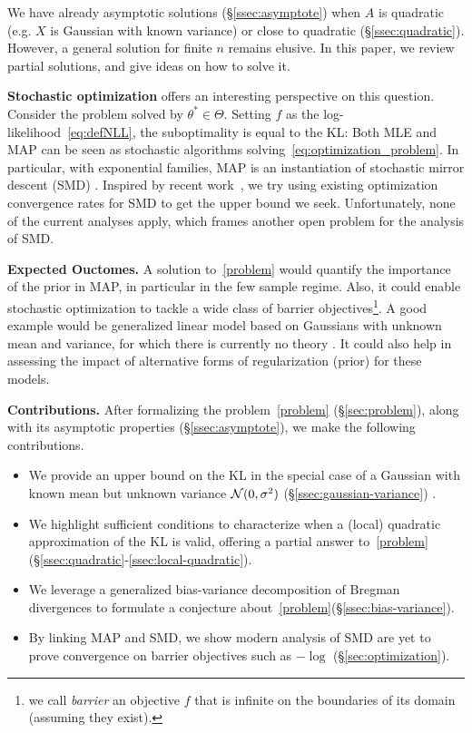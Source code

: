 \documentclass[twoside]{article}
\newcommand{\logpart}{A}
\newcommand{\nat}{\theta}
\begin{document}
We have already asymptotic solutions (\S\ref{ssec:asymptote}) when $\logpart$ is quadratic (e.g. $X$ is Gaussian with known variance)
or close to quadratic (\S\ref{ssec:quadratic}).
However, a  general solution for finite $n$ remains elusive.
In this paper, we review partial solutions, and give ideas on how to solve it.

{\bf Stochastic optimization} offers an interesting perspective on this question.
Consider the problem
solved by $\nat^*\in \Theta$.
Setting $f$ as the log-likelihood~\eqref{eq:defNLL}, the suboptimality is equal to the KL:
\alignn{
	f(\nat) - f(\nat^*) = \KL\paren{p_{\nat^*} || p_{\nat} }
	\label{eq:suboptimalityKL}
}
Both MLE and MAP can be seen as stochastic algorithms solving~\eqref{eq:optimization_problem}.
In particular, with exponential families, MAP is an instantiation of stochastic mirror descent (SMD) \citep{nemirovski2009robust}.
Inspired by recent work~\citep{lepriol2021analysis, kunstner2020homeomorphic}, we try using existing optimization convergence rates for SMD to get the upper bound we seek.
Unfortunately, none of the current analyses apply, which frames another open problem for the analysis of SMD.

{\bf Expected Ouctomes.}
A solution to~\eqref{problem} would quantify the importance of the prior in MAP, in particular in the few sample regime.%
Also, it could enable stochastic optimization to tackle a wide class of barrier objectives\footnote{we call \emph{barrier} an objective $f$ that is infinite on the boundaries of its domain (assuming they exist).}.
A good example would be generalized linear model based on Gaussians with unknown mean and variance, for which there is currently no theory \citep{bach2013nonstronglyconvex}.
It could also help in assessing the impact of alternative forms of regularization (prior) for these models. 

{\bf Contributions.}
After formalizing the problem~\eqref{problem} (\S\ref{sec:problem}), along with its asymptotic properties (\S\ref{ssec:asymptote}), we make the following contributions.
\begin{itemize}
	\itemsep0em
	\item We provide an upper bound on the KL in the special case of a Gaussian with known mean but unknown variance ${\mathcal N}(0,\sigma^2)$ (\S\ref{ssec:gaussian-variance}) .
	\item We highlight sufficient conditions to characterize when a (local) quadratic approximation of the KL is valid, offering a partial answer to~\eqref{problem} (\S\ref{ssec:quadratic}-\ref{ssec:local-quadratic}).
	\item We leverage a generalized bias-variance decomposition of Bregman divergences\citep{pfau2013generalized}  to formulate a conjecture about~\eqref{problem}(\S\ref{ssec:bias-variance}).
	\item By linking MAP and SMD, we show modern analysis of SMD are yet to prove convergence on barrier objectives such as $-\log$ (\S\ref{sec:optimization}).
\end{itemize}
\end{document}
